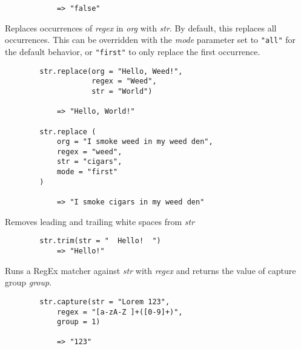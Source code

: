 \begin{multicols*}{2}
\begin{verbatim}
		    => "false"
	\end{verbatim}
	Replaces occurrences of \textit{regex} in \textit{org} with \textit{str}.
	By default, this replaces all occurrences.
	This can be overridden with the \textit{mode} parameter set to \verb|"all"| for the default behavior, or
	\verb|"first"| to only replace the first occurrence.
	\begin{verbatim}
		str.replace(org = "Hello, Weed!",
		            regex = "Weed",
		            str = "World")

		    => "Hello, World!"

		str.replace (
		    org = "I smoke weed in my weed den",
		    regex = "weed",
		    str = "cigars",
		    mode = "first"
		)

		    => "I smoke cigars in my weed den"
	\end{verbatim}
	Removes leading and trailing white spaces from \textit{str}
	\begin{verbatim}
		str.trim(str = "  Hello!  ")
		    => "Hello!"
	\end{verbatim}
	Runs a RegEx matcher against \textit{str} with \textit{regex} and returns the value of capture group \textit{group}.
	\begin{verbatim}
		str.capture(str = "Lorem 123",
            regex = "[a-zA-Z ]+([0-9]+)",
            group = 1)

		    => "123"
	\end{verbatim}
\end{multicols*}
\newpage